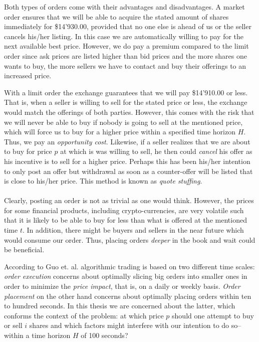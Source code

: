 Both types of orders come with their advantages and disadvantages.
A market order ensures that we will be able to acquire the stated amount of shares immediately for \$14'930.00, provided that no one else is ahead of us or the seller cancels his/her listing. 
In this case we are automatically willing to pay for the next available best price.
However, we do pay a premium compared to the limit order since ask prices are listed higher than bid prices and the more shares one wants to buy, the more sellers we have to contact and buy their offerings to an increased price.

With a limit order the exchange guarantees that we will pay \$14'910.00 or less.
That is, when a seller is willing to sell for the stated price or less, the exchange would match the offerings of both parties.
However, this comes with the risk that we will never be able to buy if nobody is going to sell at the mentioned price, which will force us to buy for a higher price within a specified time horizon $H$.
Thus, we pay an \textit{opportunity cost}.
Likewise, if a seller realizes that we are about to buy for price $p$ at which is was willing to sell, he then could \textit{cancel} his offer as his incentive is to sell for a higher price.
Perhaps this has been his/her intention to only post an offer but withdrawal as soon as a counter-offer will be listed that is close to his/her price.
This method is known as \textit{quote stuffing}.
\\
\\
Clearly, posting an order is not as trivial as one would think.
However, the prices for some financial products, including crypto-currencies, are very volatile such that it is likely to be able to buy for less than what is offered at the mentioned time $t$.
In addition, there might be buyers and sellers in the near future which would consume our order.
Thus, placing orders \textit{deeper} in the book and wait could be beneficial.

According to Guo et. al. \cite{guo2013optimal} algorithmic trading is based on two different time scales: \textit{order execution} concerns about optimally slicing big orders into smaller ones in order to minimize the \textit{price impact}, that is, on a daily or weekly basis.
\textit{Order placement} on the other hand concerns about optimally placing orders within ten to hundred seconds. 
In this thesis we are concerned about the latter, which conforms the context of the problem: 
at which price $p$ should one attempt to buy or sell $i$ shares and which factors might interfere with our intention to do so--within a time horizon $H$ of 100 seconds?

